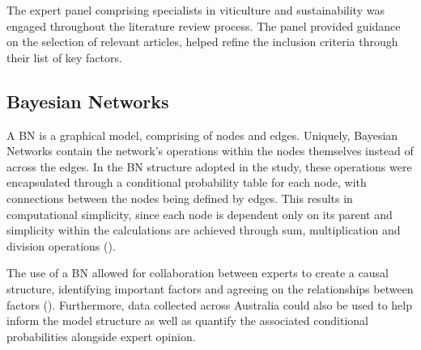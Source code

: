 \documentclass[fleqn,10pt]{wlscirep}
\begin{document}
The expert panel comprising specialists in viticulture and sustainability was engaged throughout the literature review process. The panel provided guidance on the selection of relevant articles, helped refine the inclusion criteria through their list of key factors.

\subsection*{Bayesian Networks}

A BN is a graphical model, comprising of nodes and edges. Uniquely, Bayesian Networks contain the network's operations within the nodes themselves instead of across the edges. In the BN structure adopted in the study, these operations were encapsulated through a conditional probability table for each node, with connections between the nodes being defined by edges. This results in computational simplicity, since each node is dependent only on its parent and simplicity within the calculations are achieved through sum, multiplication and division operations
(\cite{korbBayesianArtificialIntelligence2011}).

The use of a BN allowed for collaboration between experts to create a causal structure, identifying important factors and agreeing on the relationships between factors
(\cite{pourretBayesianNetworksPractical2008}). Furthermore, data collected across Australia could also be used to help inform the model structure as well as quantify the associated conditional probabilities alongside expert opinion.
\end{document}
